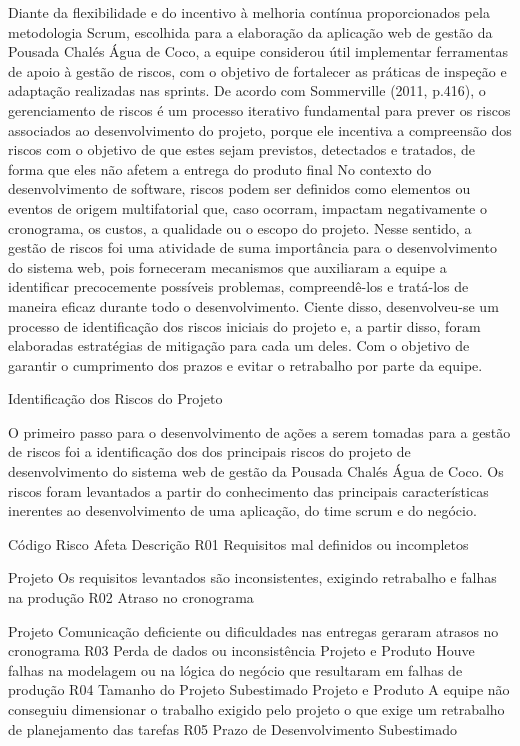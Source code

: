         Diante da flexibilidade e do incentivo à melhoria contínua proporcionados pela metodologia Scrum, escolhida para a elaboração da aplicação web de gestão da Pousada Chalés Água de Coco, a equipe considerou útil implementar ferramentas de apoio à gestão de riscos, com o objetivo de fortalecer as práticas de inspeção e adaptação realizadas nas sprints.
 De acordo com Sommerville (2011, p.416), o gerenciamento de riscos é um processo iterativo fundamental para prever os riscos associados ao desenvolvimento do projeto, porque ele incentiva a compreensão dos riscos com o objetivo de que estes sejam previstos, detectados e tratados, de forma que eles não afetem a entrega do produto final
No contexto do desenvolvimento de software, riscos podem ser definidos como elementos ou eventos de origem multifatorial que, caso ocorram, impactam negativamente  o cronograma, os custos, a qualidade ou o escopo do projeto.
 Nesse sentido, a gestão de riscos foi uma atividade de suma importância para o desenvolvimento do sistema web, pois forneceram mecanismos que auxiliaram a equipe a identificar precocemente possíveis problemas, compreendê-los e tratá-los de maneira eficaz durante todo o desenvolvimento. 
Ciente disso, desenvolveu-se um processo de identificação dos riscos iniciais do projeto e, a partir disso, foram elaboradas estratégias de mitigação para cada um deles. Com o objetivo de garantir o cumprimento dos prazos e evitar o retrabalho por parte da equipe.


Identificação dos Riscos do Projeto


        O primeiro passo para o desenvolvimento de ações a serem tomadas para a gestão de riscos foi a identificação dos dos principais riscos do projeto de desenvolvimento do sistema web de gestão da Pousada Chalés Água de Coco. Os riscos foram levantados a partir do conhecimento das principais características inerentes ao desenvolvimento de uma aplicação, do time scrum e do negócio.


Código
	Risco
	Afeta
	Descrição
	R01
	Requisitos mal definidos ou incompletos
	

Projeto 
	Os requisitos levantados são inconsistentes, exigindo retrabalho e falhas na produção
	R02
	Atraso no cronograma
	

Projeto
	Comunicação deficiente ou dificuldades nas entregas geraram atrasos no cronograma
	R03
	Perda de dados ou inconsistência
	Projeto e Produto
	Houve falhas na modelagem ou na lógica do negócio que resultaram em falhas de produção
	R04
	Tamanho do Projeto Subestimado
	Projeto e Produto
	A equipe não conseguiu dimensionar o trabalho exigido pelo projeto o que exige um retrabalho de planejamento das tarefas
	R05
	Prazo de Desenvolvimento Subestimado
	

